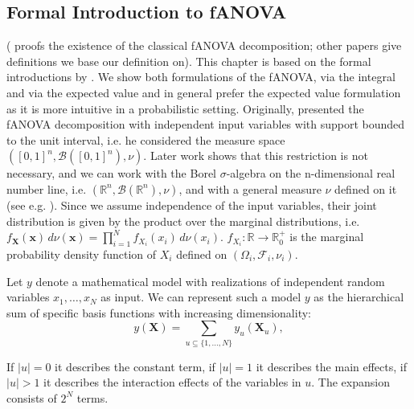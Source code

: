 \subsection{Formal Introduction to fANOVA}
(\cite{sobol1993sensitivity} proofs the existence of the classical fANOVA decomposition; other papers give definitions we base our definition on). This chapter is based on the formal introductions by \cite{rahman2014, sobol1993sensitivity, sobol2001, hooker2004, owen2013, muehlenstaedt2012}. We show both formulations of the fANOVA, via the integral and via the expected value and in general prefer the expected value formulation as it is more intuitive in a probabilistic setting.
Originally, \cite{sobol1993sensitivity} presented the fANOVA decomposition with independent input variables with support bounded to the unit interval, i.e. he considered the measure space $([0, 1]^n, \mathcal{B}([0, 1]^n), \nu)$. Later work shows that this restriction is not necessary, and we can work with the Borel $\sigma$-algebra on the n-dimensional real number line, i.e. $(\mathbb{R}^n, \mathcal{B}(\mathbb{R}^n), \nu)$, and with a general measure $\nu$ defined on it (see e.g. \cite{rahman2014}).
Since we assume independence of the input variables, their joint distribution is given by the product over the marginal distributions, i.e. \(f_{\boldsymbol{X}}(\boldsymbol{x}) \, d\nu(\boldsymbol{x}) = \prod_{i=1}^{N} f_{X_i}(x_i) \, d\nu(x_i)\). \(f_{X_i}: \mathbb{R} \rightarrow \mathbb{R}_{0}^{+}\) is the marginal probability density function of \(X_i\) defined on $(\Omega_i, \mathcal{F}_i, \nu_i)$.

\begin{definition}
Let $y$  denote a mathematical model with realizations of independent random variables $x_1, \dots, x_N$ as input. We can represent such a model $y$ as the hierarchical sum of specific basis functions with increasing dimensionality:
\begin{equation}
    y(\boldsymbol{X}) = \sum_{u \subseteq \{1, \dots, N\}} y_{u}(\boldsymbol{X}_u),
    \label{eq:fanova_decomposition}
\end{equation}
\end{definition}

If $|u| = 0$ it describes the constant term, if $|u| = 1$ it describes the main effects, if $|u| > 1$ it describes the interaction effects of the variables in $u$. The expansion consists of $2^N$ terms.\par

